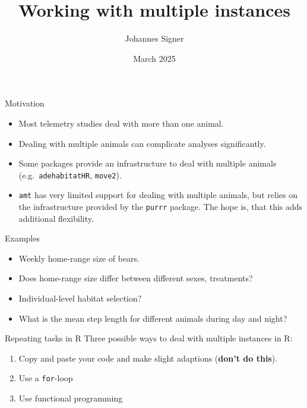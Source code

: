 \documentclass[ignorenonframetext,,t]{beamer}
\title{Working with multiple instances}
\author{Johannes Signer}
\date{March 2025}
\let\oldtextbf\textbf
\renewcommand{\textbf}[1]{\textcolor{spamwell}{\oldtextbf{#1}}}
\providecommand{\tightlist}{%
\setlength{\itemsep}{0pt}\setlength{\parskip}{0pt}}
\providecommand{\tightlist}{%
\setlength{\itemsep}{0pt}\setlength{\parskip}{0pt}}
\renewcommand{\tightlist}{\setlength{\itemsep}{1.4ex}\setlength{\parskip}{0pt}}
\begin{document}
\frame{\titlepage}



\begin{frame}[fragile]{Motivation}
\label{motivation}
\begin{itemize}
\tightlist
\item
  Most telemetry studies deal with more than one animal.
\item
  Dealing with multiple animals can complicate analyses significantly.
\item
  Some packages provide an infrastructure to deal with multiple animals
  (e.g.~\texttt{adehabitatHR}, \texttt{move2}).
\item
  \texttt{amt} has very limited support for dealing with multiple
  animals, but relies on the infrastructure provided by the
  \texttt{purrr} package. The hope is, that this adds additional
  flexibility.
\end{itemize}
\end{frame}

\begin{frame}{Examples}
\label{examples}
\begin{itemize}
\tightlist
\item
  Weekly home-range size of bears.
\item
  Does home-range size differ between different sexes, treatments?
\item
  Individual-level habitat selection?
\item
  What is the mean step length for different animals during day and
  night?
\end{itemize}
\end{frame}

\begin{frame}[fragile]{Repeating tasks in R}
\label{repeating-tasks-in-r}
Three possible ways to deal with multiple instances in R:

\begin{enumerate}
\tightlist
\item
  Copy and paste your code and make slight adaptions (\textbf{don't do
  this}).
\item
  Use a \texttt{for}-loop
\item
  Use functional programming
\end{enumerate}
\end{frame}
\end{document}
